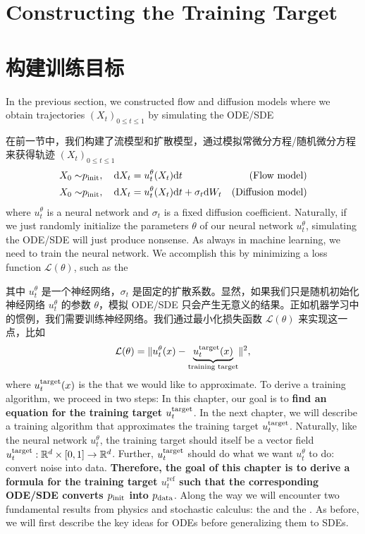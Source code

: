 \section{Constructing the Training Target}

\section{构建训练目标}
\label{sec:fokker_planck}

In the previous section, we constructed flow and diffusion models where we obtain trajectories $(X_t)_{0\leq t\leq 1}$ by simulating the ODE/SDE

在前一节中，我们构建了流模型和扩散模型，通过模拟常微分方程/随机微分方程来获得轨迹 $(X_t)_{0\leq t\leq 1}$
\begin{align}
\label{e:sde_generative_model_restated_section_3}
 X_0\sim&p_{\rm{init}},\quad \mathrm{d} X_t = u_t^\theta(X_t)\mathrm{d} t& \text{(Flow model)}\\
 X_0\sim&p_{\rm{init}},\quad \mathrm{d} X_t = u_t^\theta(X_t)\mathrm{d} t + \sigma_t\mathrm{d} W_t& \text{(Diffusion model)}
\end{align}
where $u_t^\theta$ is a neural network and $\sigma_t$ is a fixed diffusion coefficient. Naturally, if we just randomly initialize the parameters $\theta$ of our neural network $u_t^\theta$, simulating the ODE/SDE will just produce nonsense. As always in machine learning, we need to train the neural network. We accomplish this by minimizing a loss function $\mathcal{L}(\theta)$, such as the 

其中 $u_t^\theta$ 是一个神经网络，$\sigma_t$ 是固定的扩散系数。显然，如果我们只是随机初始化神经网络 $u_t^\theta$ 的参数 $\theta$，模拟 ODE/SDE 只会产生无意义的结果。正如机器学习中的惯例，我们需要训练神经网络。我们通过最小化损失函数 $\mathcal{L}(\theta)$ 来实现这一点，比如 
\begin{align*}
    \mathcal{L}(\theta) = \lVert u_t^\theta(x)-\underbrace{u^{\text{target}}_t(x)}_{\text{training target}}\rVert^2 ,
\end{align*}
where $u^{\text{target}}_t(x)$ is the  that we would like to approximate. To derive a training algorithm, we proceed in two steps: In this chapter, our goal is to \textbf{find an equation for the training target $u^{\text{target}}_t$}. In the next chapter, we will describe a training algorithm that approximates the training target $u^{\text{target}}_t$. Naturally, like the neural network $u_t^\theta$, the training target should itself be a vector field $u^{\text{target}}_t:\mathbb{R}^d\times[0,1]\to\mathbb{R}^d$. Further, $u^{\text{target}}_t$ should do what we want $u_t^\theta$ to do: convert noise into data. \textbf{Therefore, the goal of this chapter is to derive a formula for the training target $u_t^\text{ref}$ such that the corresponding ODE/SDE converts $p_{\rm{init}}$ into $p_{\rm{data}}$}. Along the way we will encounter two fundamental results from physics and stochastic calculus: the  and the . As before, we will first describe the key ideas for ODEs before generalizing them to SDEs.

